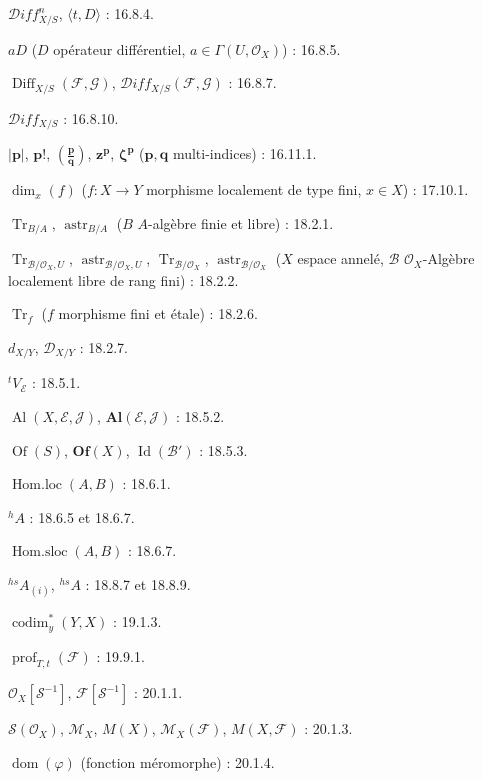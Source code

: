 $\mathcal{D}iff^{n}_{X/S}$, $\langle t,D\rangle$ : 16.8.4.

$aD$ ($D$ opérateur différentiel, $a\in\Gamma(U,\mathcal{O}_X)$) : 16.8.5.

$\operatorname{Diff}_{X/S}(\mathcal{F},\mathcal{G})$,
$\mathcal{D}iff_{X/S}(\mathcal{F},\mathcal{G})$ : 16.8.7.

$\mathcal{D}iff_{X/S}$ : 16.8.10.

$|\mathbf p|$, $\mathbf p!$, $\genfrac{(}{)}{}{}{\mathbf p}{\mathbf q}$,
$\mathbf z^{\mathbf p}$, $\boldsymbol\zeta^{\mathbf p}$
($\mathbf p,\mathbf q$ multi-indices) : 16.11.1.

$\dim_x(f)$ ($f:X\to Y$ morphisme localement de type fini, $x\in X$) : 17.10.1.

$\operatorname{Tr}_{B/A}$, $\operatorname{astr}_{B/A}$
($B$ $A$-algèbre finie et libre) : 18.2.1.

$\operatorname{Tr}_{\mathcal B/\mathcal O_X,U}$,
$\operatorname{astr}_{\mathcal B/\mathcal O_X,U}$,
$\operatorname{Tr}_{\mathcal B/\mathcal O_X}$,
$\operatorname{astr}_{\mathcal B/\mathcal O_X}$
($X$ espace annelé, $\mathcal B$ $\mathcal O_X$-Algèbre localement libre de rang fini) : 18.2.2.

$\operatorname{Tr}_f$ ($f$ morphisme fini et étale) : 18.2.6.

$d_{X/Y}$, $\mathcal D_{X/Y}$ : 18.2.7.

${}^{t}V_{\mathcal E}$ : 18.5.1.

$\operatorname{Al}(X,\mathcal E,\mathcal J)$, $\mathbf{Al}(\mathcal E,\mathcal J)$ : 18.5.2.

$\operatorname{Of}(S)$, $\mathbf{Of}(X)$, $\operatorname{Id}(\mathcal B')$ : 18.5.3.

$\operatorname{Hom.loc}(A,B)$ : 18.6.1.

${}^{h}A$ : 18.6.5 et 18.6.7.

$\operatorname{Hom.sloc}(A,B)$ : 18.6.7.

${}^{hs}A_{(i)}$, ${}^{hs}A$ : 18.8.7 et 18.8.9.

$\operatorname{codim}^{*}_{y}(Y,X)$ : 19.1.3.

$\operatorname{prof}_{T,t}(\mathcal F)$ : 19.9.1.

$\mathcal O_X[\mathcal S^{-1}]$, $\mathcal F[\mathcal S^{-1}]$ : 20.1.1.

$\mathcal S(\mathcal O_X)$, $\mathcal M_X$, $M(X)$,
$\mathcal M_X(\mathcal F)$, $M(X,\mathcal F)$ : 20.1.3.

$\operatorname{dom}(\varphi)$ (fonction méromorphe) : 20.1.4.

